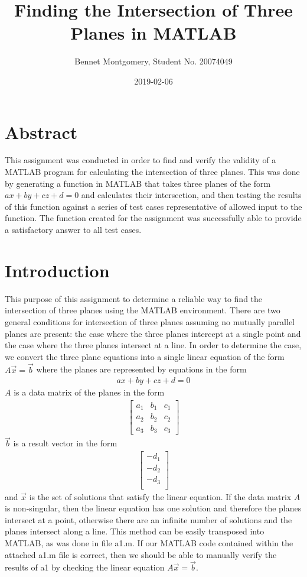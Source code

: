 \documentclass{article}
\title{Finding the Intersection of Three Planes in MATLAB}
\author{Bennet Montgomery, Student No. 20074049}
\date{2019-02-06}
\begin{document}
	\maketitle
	\section*{Abstract}
	This assignment was conducted in order to find and verify the validity of a MATLAB program for calculating the intersection of three planes. This was done by generating a function in MATLAB that takes three planes of the form $ax + by + cz + d = 0$ and calculates their intersection, and then testing the results of this function against a series of test cases representative of allowed input to the function. The function created for the assignment was successfully able to provide a satisfactory answer to all test cases.
	
	\section*{Introduction}
	This purpose of this assignment to determine a reliable way to find the intersection of three planes using the MATLAB environment. There are two general conditions for intersection of three planes assuming no mutually parallel planes are present: the case where the three planes intercept at a single point and the case where the three planes intersect at a line. In order to determine the case, we convert the three plane equations into a single linear equation of the form $A\vec{x}=\vec{b}$ where the planes are represented by equations in the form
		\begin{align*}
			ax + by + cz + d = 0
		\end{align*}
	$A$ is a data matrix of the planes in the form
		\begin{align*}
			\left[\begin{matrix}
				a_1 & b_1 & c_1\\
				a_2 & b_2 & c_2\\
				a_3 & b_3 & c_3
			\end{matrix}\right]
		\end{align*}
	$\vec{b}$ is a result vector in the form
		\begin{align*}
			\left[\begin{matrix}
				-d_1\\
				-d_2\\
				-d_3\\
			\end{matrix}\right]
		\end{align*}
	 and $\vec{x}$ is the set of solutions that satisfy the linear equation. If the data matrix $A$ is non-singular, then the linear equation has one solution and therefore the planes intersect at a point, otherwise there are an infinite number of solutions and the planes intersect along a line. This method can be easily transposed into MATLAB, as was done in file a1.m. If our MATLAB code contained within the attached a1.m file is correct, then we should be able to manually verify the results of a1 by checking the linear equation $A\vec{x}=\vec{b}$.
\end{document}
